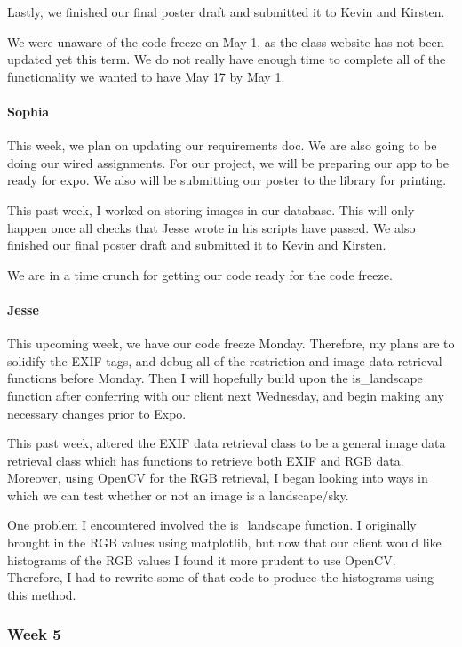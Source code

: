 \documentclass[onecolumn, draftclsnofoot,10pt, compsoc]{IEEEtran}
\begin{document}
\begin{flushleft}
Lastly, we finished our final poster draft and submitted it to Kevin and Kirsten.
 
 
We were unaware of the code freeze on May 1, as the class website has not been updated yet this term. We do not really have enough time to complete all of the functionality we wanted to have May 17 by May 1.
 
\paragraph{Sophia}
 
This week, we plan on updating our requirements doc. We are also going to be doing our wired assignments. For our project, we will be preparing our app to be ready for expo. We also will be submitting our poster to the library for printing.
 
 
This past week, I worked on storing images in our database. This will only happen once all checks that Jesse wrote in his scripts have passed. We also finished our final poster draft and submitted it to Kevin and Kirsten.
 
 
We are in a time crunch for getting our code ready for the code freeze.
 
\paragraph{Jesse}
 
This upcoming week, we have our code freeze Monday. Therefore, my plans are to solidify the EXIF tags, and debug all of the restriction and image data retrieval functions before Monday. Then I will hopefully build upon the is\_landscape function after conferring with our client next Wednesday, and begin making any necessary changes prior to Expo.
 
 
This past week, altered the EXIF data retrieval class to be a general image data retrieval class which has functions to retrieve both EXIF and RGB data. Moreover, using OpenCV for the RGB retrieval, I began looking into ways in which we can test whether or not an image is a landscape/sky.
 
 
One problem I encountered involved the is\_landscape function. I originally brought in the RGB values using matplotlib, but now that our client would like histograms of the RGB values I found it more prudent to use OpenCV. Therefore, I had to rewrite some of that code to produce the histograms using this method.
 
\subsubsection{Week 5}

\end{flushleft}
\end{document}
